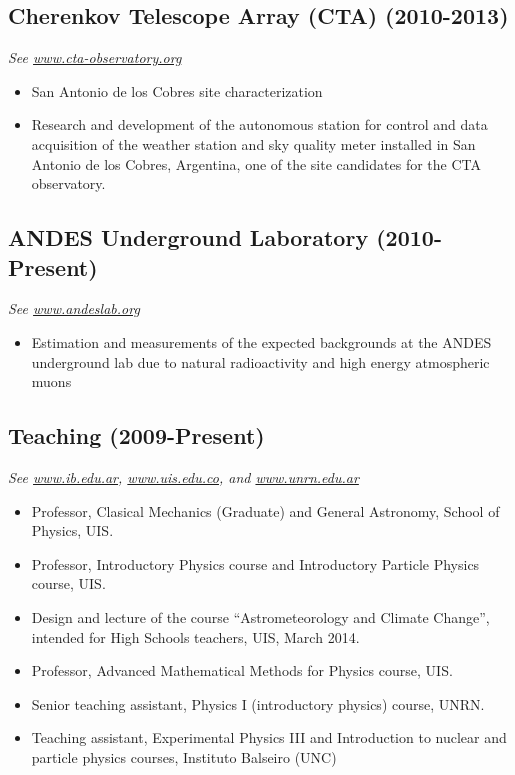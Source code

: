 \subsection*{Cherenkov Telescope Array (CTA) (2010-2013)}
{\small{\textit{See \href{http://www.cta-observatory.org}{www.cta-observatory.org}}}}
\begin{itemize}
\item San Antonio de los Cobres site characterization
\item Research and development of the autonomous station for control and data
acquisition of the weather station and sky quality meter installed in San
Antonio de los Cobres, Argentina, one of the site candidates for the CTA
observatory.
\end{itemize}

\subsection*{ANDES Underground Laboratory (2010-Present)}
{\small{\textit{See \href{http://www.andeslab.org}{www.andeslab.org}}}}
\begin{itemize}
\item Estimation and measurements of the expected backgrounds at the ANDES
underground lab due to natural radioactivity and high energy atmospheric muons
\end{itemize}

\subsection*{Teaching (2009-Present)}
{\small{\textit{See \href{http://www.ib.edu.ar}{www.ib.edu.ar}, \href{http://www.uis.edu.co}{www.uis.edu.co}, and \href{http://www.unrn.edu.ar}{www.unrn.edu.ar}}}}
\begin{itemize}
\item Professor, Clasical Mechanics (Graduate) and General Astronomy, School of Physics, UIS.
\item Professor, Introductory Physics course and Introductory Particle Physics course, UIS.
\item Design and lecture of the course ``Astrometeorology and Climate Change'', intended for High Schools teachers, UIS, March 2014.
\item Professor, Advanced Mathematical Methods for Physics course, UIS.
\item Senior teaching assistant, Physics I (introductory physics) course, UNRN.
\item Teaching assistant, Experimental Physics III and Introduction to nuclear
and particle physics courses, Instituto Balseiro (UNC)
\end{itemize}
\else
